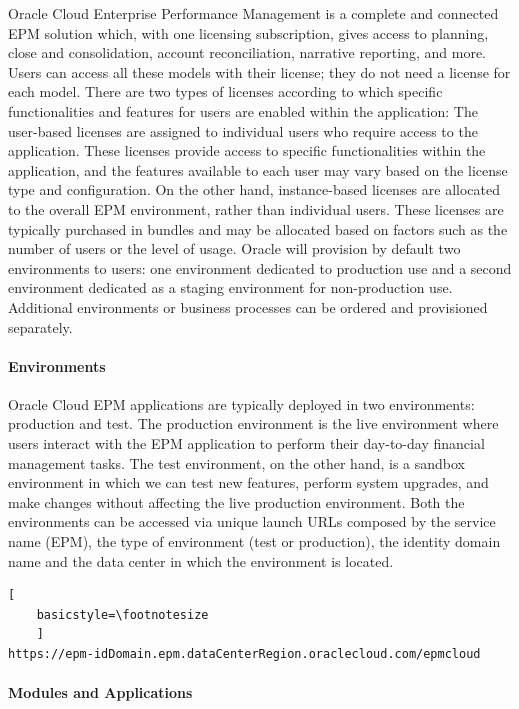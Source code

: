 \documentclass[12pt,a4paper,openright,twoside]{book}
\begin{document}
Oracle Cloud Enterprise Performance Management is a complete and connected EPM solution which, with one licensing subscription, gives access to planning, close and consolidation, account reconciliation, narrative reporting, and more.
%
Users can access all these models with their license; they do not need a license for each model.
%
There are two types of licenses according to which specific functionalities and features for users are enabled within the application:
%
The user-based licenses are assigned to individual users who require access to the application.
%
These licenses provide access to specific functionalities within the application, and the features available to each user may vary based on the license type and configuration.
%
On the other hand, instance-based licenses are allocated to the overall EPM environment, rather than individual users. 
%
These licenses are typically purchased in bundles and may be allocated based on factors such as the number of users or the level of usage.
%
Oracle will provision by default two environments to users: one environment dedicated to production use and a second environment dedicated as a staging environment for non-production use.
%
Additional environments or business processes can be ordered and provisioned separately.

\paragraph{Environments}

Oracle Cloud EPM applications are typically deployed in two environments: production and test.
%
The production environment is the live environment where users interact with the EPM application to perform their day-to-day financial management tasks.
%
The test environment, on the other hand, is a sandbox environment in which we can test new features, perform system upgrades, and make changes without affecting the live production environment. 
%
Both the environments can be accessed via unique launch URLs composed by the service name (EPM), the type of environment (test or production), the identity domain name and the data center in which the environment is located.\\

\begin{lstlisting}[
    basicstyle=\footnotesize
    ]
https://epm-idDomain.epm.dataCenterRegion.oraclecloud.com/epmcloud
\end{lstlisting}

\paragraph{Modules and Applications}
\end{document}
